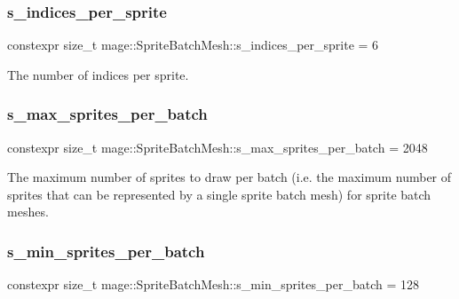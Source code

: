 \subsubsection{\texorpdfstring{s\+\_\+indices\+\_\+per\+\_\+sprite}{s\_indices\_per\_sprite}}
{\footnotesize\ttfamily constexpr size\+\_\+t mage\+::\+Sprite\+Batch\+Mesh\+::s\+\_\+indices\+\_\+per\+\_\+sprite = 6\hspace{0.3cm}{\ttfamily [static]}}

The number of indices per sprite. \hypertarget{classmage_1_1_sprite_batch_mesh_a9c927eae74553f110cef6046cc00fc7b}{}\label{classmage_1_1_sprite_batch_mesh_a9c927eae74553f110cef6046cc00fc7b} 
\subsubsection{\texorpdfstring{s\+\_\+max\+\_\+sprites\+\_\+per\+\_\+batch}{s\_max\_sprites\_per\_batch}}
{\footnotesize\ttfamily constexpr size\+\_\+t mage\+::\+Sprite\+Batch\+Mesh\+::s\+\_\+max\+\_\+sprites\+\_\+per\+\_\+batch = 2048\hspace{0.3cm}{\ttfamily [static]}}

The maximum number of sprites to draw per batch (i.\+e. the maximum number of sprites that can be represented by a single sprite batch mesh) for sprite batch meshes. \hypertarget{classmage_1_1_sprite_batch_mesh_aa924d282c2c4d0be90e6497b3af6d6e7}{}\label{classmage_1_1_sprite_batch_mesh_aa924d282c2c4d0be90e6497b3af6d6e7} 
\subsubsection{\texorpdfstring{s\+\_\+min\+\_\+sprites\+\_\+per\+\_\+batch}{s\_min\_sprites\_per\_batch}}
{\footnotesize\ttfamily constexpr size\+\_\+t mage\+::\+Sprite\+Batch\+Mesh\+::s\+\_\+min\+\_\+sprites\+\_\+per\+\_\+batch = 128\hspace{0.3cm}{\ttfamily [static]}}

